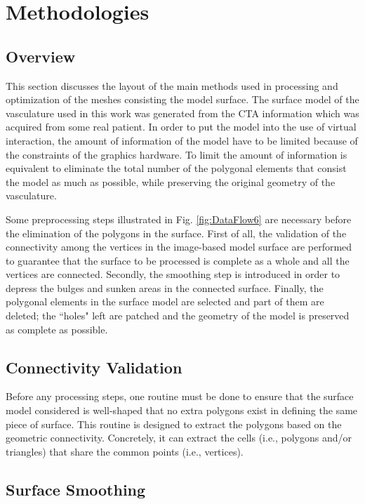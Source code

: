 
\section{Methodologies}
\label{sec6_2}

\subsection{Overview}

This section discusses the layout of the main methods used in processing and optimization of the meshes consisting the model surface.
The surface model of the vasculature used in this work was generated from the CTA information which was acquired from some real patient.
In order to put the model into the use of virtual interaction, the amount of information of the model have to be limited because of the constraints of the graphics hardware.
To limit the amount of information is equivalent to eliminate the total number of the polygonal elements that consist the model as much as possible, while preserving the original geometry of the vasculature. %

Some preprocessing steps illustrated in Fig. \ref{fig:DataFlow6} are necessary before the elimination of the polygons in the surface.
First of all, the validation of the connectivity among the vertices in the image-based model surface are performed to guarantee that the surface to be processed is complete as a whole and all the vertices are connected. %
Secondly, the smoothing step is introduced in order to depress the bulges and sunken areas in the connected surface.
Finally, the polygonal elements in the surface model are selected and part of them are deleted; the ``holes" left are patched and the geometry of the model is preserved as complete as possible. %

\subsection{Connectivity Validation}

Before any processing steps, one routine must be done to ensure that the surface model considered is well-shaped that no extra polygons exist in defining the same piece of surface.
This routine is designed to extract the polygons based on the geometric connectivity.
Concretely, it can extract the cells (i.e., polygons and/or triangles) that share the common points (i.e., vertices).

\subsection{Surface Smoothing}

